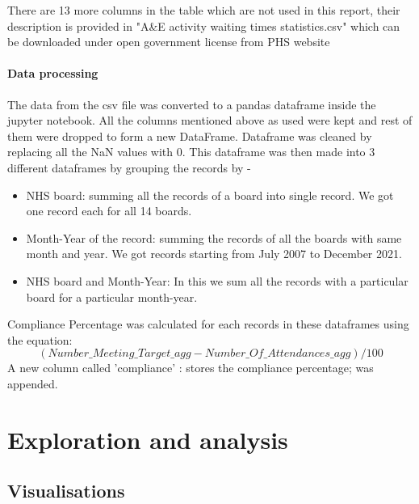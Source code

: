 \documentclass[11pt,a4paper]{article}
\begin{document}
There are 13 more columns in the table which are not used in this report, their description is provided in "A\&E activity waiting times statistics.csv" which can be downloaded under open government license from PHS website \cite{waiting_time_publication}


\paragraph{Data processing} 
The data from the csv file was converted to a pandas dataframe inside the jupyter notebook. All the columns mentioned above as used were kept and rest of them were dropped to form a new DataFrame. Dataframe was cleaned by replacing all the NaN values with 0. This dataframe was then made into 3 different dataframes by grouping the records by -
\begin{itemize}
    \item NHS board: summing all the records of a board into single record. We got one record each for all 14 boards. 
    \item Month-Year of the record: summing the records of all the boards with same month and year. We got records starting from July 2007 to December 2021.
    \item NHS board and Month-Year: In this we sum all the records with a particular board for a particular month-year.
\end{itemize}
Compliance Percentage was calculated for each records in these dataframes using the equation:
\begin{equation}
    (Number\_Meeting\_Target\_agg - Number\_Of\_Attendances\_agg) /100
\end{equation}
A new column called 'compliance' : stores the compliance percentage; was appended.

\section{Exploration and  analysis}

\subsection{Visualisations}
\end{document}
